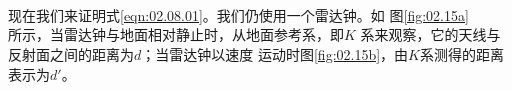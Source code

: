 \begin{figure}[!b]
  \centering
   \\ \vspace{-0.3em}
   \\ \vspace{-0.3em}
   \\ \vspace{-0.3em}
  \caption{}
  \label{fig:02.15}
\end{figure}
现在我们来证明式\eqref{eqn:02.08.01}。我们仍使用一个雷达钟。如
图\ref{fig:02.15a}\\所示，当雷达钟与地面相对静止时，从地面参考系，即$K$
系来观察，它的天线与反射面之间的距离为$ d$；当雷达钟以速度
运动时\lbr 图\ref{fig:02.15b}\rbr ，由$K$系测得的距离表示为$d'$。

